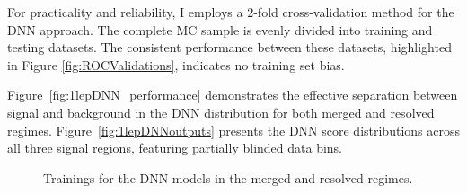 For practicality and reliability, I employs a 2-fold cross-validation method for the DNN approach. The complete MC sample is evenly divided into training and testing datasets. The consistent performance between these datasets, highlighted in Figure \ref{fig:ROCValidations}, indicates no training set bias. 


Figure~\ref{fig:1lepDNN_performance} demonstrates the effective separation between signal and background in the DNN distribution for both merged and resolved regimes. Figure~\ref{fig:1lepDNNoutputs} presents the DNN score distributions across all three signal regions, featuring partially blinded data bins.


\begin{figure}[ht]
      \centering
       \caption{Trainings for the DNN models in the merged and resolved regimes.}
       \label{fig:LossAndAccuracy}
\end{figure}

